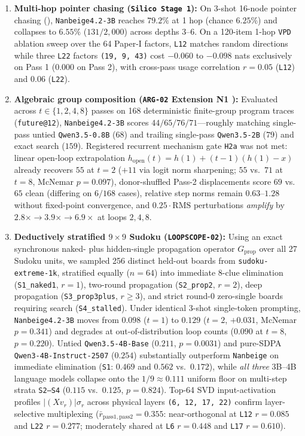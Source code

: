 \documentclass[10pt,letterpaper]{article}
\newcommand{\Gprop}{G_{\mathrm{prop}}}
\begin{document}
\begin{enumerate}[topsep=3pt,itemsep=2pt]
  \item \textbf{Multi-hop pointer chasing (\texttt{Silico Stage 1}):} On 3-shot 16-node pointer chasing (), \texttt{Nanbeige4.2-3B} reaches $79.2\%$ at 1 hop (chance $6.25\%$) and collapses to $6.55\%$ ($131/2{,}000$) across depths 3--6. On a 120-item 1-hop \texttt{VPD} ablation sweep over the 64 Paper-I factors, \texttt{L12} matches random directions while three \texttt{L22} factors \texttt{(19, 9, 43)} cost $-0.060$ to $-0.098$ nats exclusively on Pass 1 ($0.000$ on Pass 2), with cross-pass usage correlation $r = 0.05$ (\texttt{L12}) and $0.06$ (\texttt{L22}).
  \item \textbf{Algebraic group composition (\texttt{ARG-02} Extension N1 \cite{dugan2026arg02}):} Evaluated across $t \in \{1, 2, 4, 8\}$ passes on 168 deterministic finite-group program traces (\texttt{future@12}), \texttt{Nanbeige4.2-3B} scores $44 / 65 / 76 / 71$—roughly matching single-pass untied \texttt{Qwen3.5-0.8B} ($68$) and trailing single-pass \texttt{Qwen3.5-2B} ($79$) and exact search ($159$). Registered recurrent mechanism gate \texttt{H2a} was not met: linear open-loop extrapolation $h_{\mathrm{open}}(t) = h(1) + (t-1)(h(1)-x)$ already recovers $55$ at $t=2$ ($+11$ via logit norm sharpening; $55$ vs.\ $71$ at $t=8$, McNemar $p=0.097$), donor-shuffled Pass-2 displacements score $69$ vs.\ $65$ clean (differing on $6/168$ cases), relative step norms remain $0.63$--$1.28$ without fixed-point convergence, and $0.25\cdot\mathrm{RMS}$ perturbations \emph{amplify} by $2.8\times \to 3.9\times \to 6.9\times$ at loops $2, 4, 8$.
  \item \textbf{Deductively stratified $9\times 9$ Sudoku (\texttt{LOOPSCOPE-02}):} Using an exact synchronous naked- plus hidden-single propagation operator $\Gprop$ over all 27 Sudoku units, we sampled 256 distinct held-out boards from \texttt{sudoku-extreme-1k}, stratified equally ($n=64$) into immediate 8-clue elimination (\texttt{S1\_naked1}, $r=1$), two-round propagation (\texttt{S2\_prop2}, $r=2$), deep propagation (\texttt{S3\_prop3plus}, $r\ge 3$), and strict round-0 zero-single boards requiring search (\texttt{S4\_stalled}). Under identical 3-shot single-token prompting, \texttt{Nanbeige4.2-3B} moves from $0.098$ ($t=1$) to $0.129$ ($t=2$, $+0.031$, McNemar $p=0.341$) and degrades at out-of-distribution loop counts ($0.090$ at $t=8$, $p=0.220$). Untied \texttt{Qwen3.5-4B-Base} ($0.211$, $p=0.0031$) and pure-SDPA \texttt{Qwen3-4B-Instruct-2507} ($0.254$) substantially outperform \texttt{Nanbeige} on immediate elimination (\texttt{S1}: $0.469$ and $0.562$ vs.\ $0.172$), while \emph{all three} 3B--4B language models collapse onto the $1/9 \approx 0.111$ uniform floor on multi-step strata \texttt{S2--S4} ($0.115$ vs.\ $0.125$, $p=0.824$). Top-64 SVD input-activation profiles $|(X v_r)|\sigma_r$ across physical layers \texttt{(6, 12, 17, 22)} confirm layer-selective multiplexing ($\bar{r}_{\mathrm{pass1,pass2}} = 0.355$: near-orthogonal at \texttt{L12} $r=0.085$ and \texttt{L22} $r=0.277$; moderately shared at \texttt{L6} $r=0.448$ and \texttt{L17} $r=0.610$).
\end{enumerate}
\end{document}
